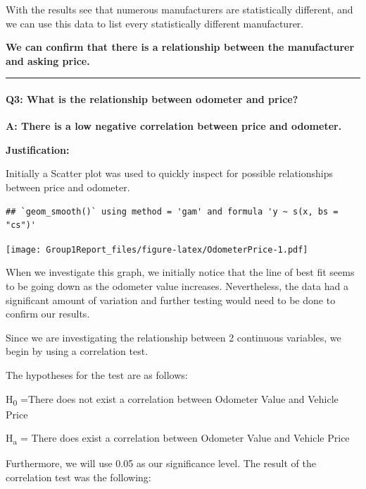 \documentclass[
]{article}
\begin{document}
With the results see that numerous manufacturers are statistically
different, and we can use this data to list every statistically
different manufacturer.

\textbf{We can confirm that there is a relationship between the
manufacturer and asking price.}

\begin{center}\rule{0.5\linewidth}{0.5pt}\end{center}

\hypertarget{q3-what-is-the-relationship-between-odometer-and-price}{%
\paragraph{\texorpdfstring{\textbf{Q3:} What is the relationship between
odometer and
price?}{Q3: What is the relationship between odometer and price?}}\label{q3-what-is-the-relationship-between-odometer-and-price}}

\textbf{A: There is a low negative correlation between price and
odometer.}

\textbf{Justification:}

Initially a Scatter plot was used to quickly inspect for possible
relationships between price and odometer.

\begin{verbatim}
## `geom_smooth()` using method = 'gam' and formula 'y ~ s(x, bs = "cs")'
\end{verbatim}

\texttt{[image: Group1Report\_files/figure-latex/OdometerPrice-1.pdf]}

When we investigate this graph, we initially notice that the line of
best fit seems to be going down as the odometer value increases.
Nevertheless, the data had a significant amount of variation and further
testing would need to be done to confirm our results.

Since we are investigating the relationship between 2 continuous
variables, we begin by using a correlation test.

The hypotheses for the test are as follows:

H\textsubscript{0} =There does not exist a correlation between Odometer
Value and Vehicle Price

H\textsubscript{a} = There does exist a correlation between Odometer
Value and Vehicle Price

Furthermore, we will use 0.05 as our significance level. The result of
the correlation test was the following:
\end{document}
